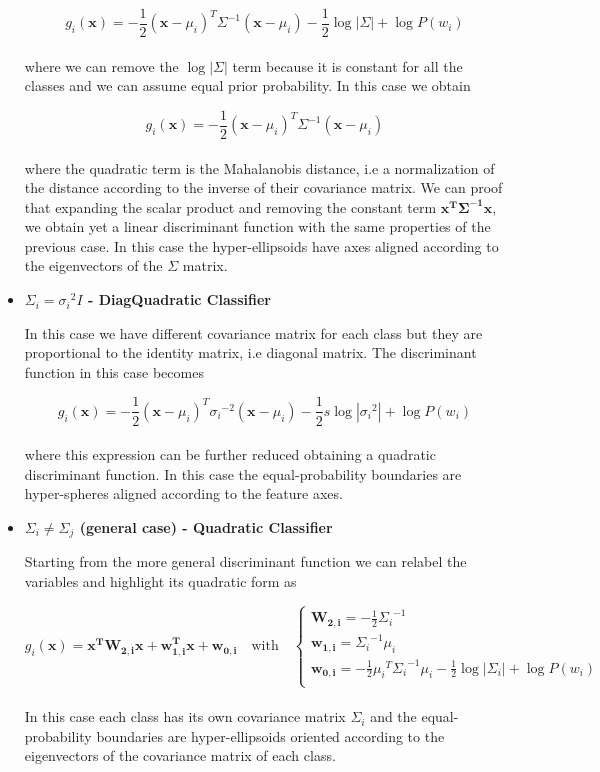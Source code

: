 \documentclass{standalone}
\begin{document}
\begin{itemize}
$$
g_i(\mathbf{x}) = -\frac{1}{2}(\mathbf{x}-\mu_i)^T{\Sigma}^{-1}(\mathbf{x}-\mu_i) -\frac{1}{2}\log\left|\Sigma\right|+\log P(w_i)
$$
\\
where we can remove the $\log\left|\Sigma\right|$ term because it is constant for all the classes and we can assume equal prior probability.
In this case we obtain

$$
g_i(\mathbf{x}) = -\frac{1}{2}(\mathbf{x}-\mu_i)^T{\Sigma}^{-1}(\mathbf{x}-\mu_i)
$$
\\
where the quadratic term is the Mahalanobis distance, i.e a normalization of the distance according to the inverse of their covariance matrix.
We can proof that expanding the scalar product and removing the constant term $\mathbf{x^T\Sigma^{-1}x}$, we obtain yet a linear discriminant function with the same properties of the previous case.
In this case the hyper-ellipsoids have axes aligned according to the eigenvectors of the $\Sigma$ matrix.


\item \textbf{$\Sigma_i = {\sigma_i}^2I$ - DiagQuadratic Classifier}

In this case we have different covariance matrix for each class but they are proportional to the identity matrix, i.e diagonal matrix.
The discriminant function in this case becomes

$$
g_i(\mathbf{x}) = -\frac{1}{2}(\mathbf{x}-\mu_i)^T{\sigma_i}^{-2}(\mathbf{x}-\mu_i) -\frac{1}{2}s\log\left|{\sigma_i}^2\right|+\log P(w_i)
$$
\\
where this expression can be further reduced obtaining a quadratic discriminant function.
In this case the equal-probability boundaries are hyper-spheres aligned according to the feature axes.


\item \textbf{$\Sigma_i \neq\Sigma_j$ (general case) - Quadratic Classifier}

Starting from the more general discriminant function we can relabel the variables and highlight its quadratic form as

$$
g_i(\mathbf{x}) = \mathbf{x^TW_{2,i}x}+\mathbf{w_{1,i}^Tx} + \mathbf{w_{0,i}} \quad \mbox{with}\quad \left\{\begin{array}{l} \mathbf{W_{2,i}}=-\frac{1}{2}{\Sigma_i}^{-1}\\ \mathbf{w_{1,i}}={\Sigma_i}^{-1}\mu_i \\ \mathbf{w_{0,i}}=-\frac{1}{2}{\mu_i}^T{\Sigma_i}^{-1}\mu_i-\frac{1}{2}\log\left|\Sigma_i\right|+\log P(w_i) \\ \end{array}\right.
$$
\\
In this case each class has its own covariance matrix $\Sigma_i$ and the equal-probability boundaries are hyper-ellipsoids oriented according to the eigenvectors of the covariance matrix of each class.

\end{itemize}
\end{document}
